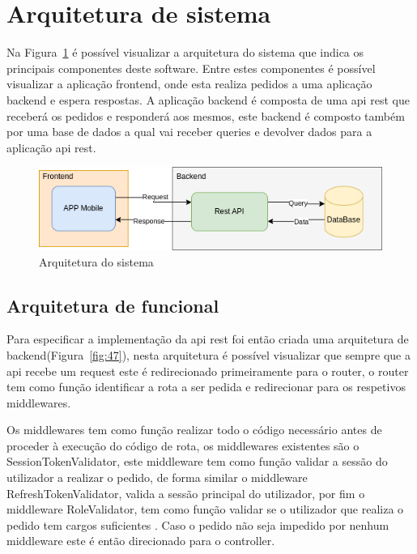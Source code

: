 \section{Arquitetura de sistema}
Na Figura~\ref{fig:46} é possível visualizar a arquitetura do sistema que indica os principais 
componentes deste software. Entre estes componentes é possível visualizar a aplicação frontend, 
onde esta realiza pedidos a uma aplicação backend e espera respostas. A aplicação backend é composta 
de uma api rest que receberá os pedidos e responderá aos mesmos, este backend é composto também por 
uma base de dados a qual vai receber queries e devolver dados para a aplicação api rest.

\begin{figure}[htb]
    \centering
    
    \includegraphics[width=\textwidth]{images/Arquiteturas/arquitetura_de_solucao.png}
    \caption{Arquitetura do sistema}
    \label{fig:46}
\end{figure}

\newpage

\subsection{Arquitetura de funcional}

Para especificar a implementação da api rest foi então criada uma arquitetura de 
backend(Figura~\ref{fig:47}), nesta arquitetura é possível visualizar que sempre que a api 
recebe um request este é redirecionado primeiramente para o router, o router tem como função 
identificar a rota a ser pedida e redirecionar para os respetivos middlewares. 

Os middlewares tem como função realizar todo o código necessário antes de proceder à execução 
do código de rota, os middlewares existentes são o SessionTokenValidator, este middleware tem 
como função validar a sessão do utilizador a realizar o pedido, de forma similar o middleware 
RefreshTokenValidator, valida a sessão principal do utilizador, por fim o middleware RoleValidator, 
tem como função validar se o utilizador que realiza o pedido tem cargos suficientes . 
Caso o pedido não seja impedido por nenhum middleware este é então direcionado para o 
controller.

